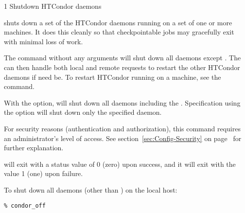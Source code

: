 \begin{ManPage}{\label{man-condor-off}}{1}
{Shutdown HTCondor daemons}
\Synopsis {}
\ToolArgsBase

\ToolDebugOption
\ToolWhere
\ToolArgsAffect


\Description 

 shuts down a set of the HTCondor daemons running on a set of
one or more machines.
It does this cleanly so that checkpointable jobs may gracefully exit with
minimal loss of work.

The command  without any arguments will shut down
all daemons except .
The  can then handle both local and remote
requests to restart the other HTCondor daemons if need be.  To restart
HTCondor running on a machine, see the  command.

With the  option,  will shut down
all daemons including the .
Specification using the  option
will shut down
only the specified daemon.

For security reasons (authentication and authorization),
this command requires an administrator's level of access.
See
section~\ref{sec:Config-Security} on page~\pageref{sec:Config-Security}
for further explanation.

\begin{Options}
	\ToolArgsBaseDesc
	\ToolDebugDesc
	\ToolArgsLocateDesc
	\ToolArgsAffectDesc
\end{Options}

\ExitStatus
{} will exit with a status value of 0 (zero) upon success,
and it will exit with the value 1 (one) upon failure.


\Examples
To shut down all daemons (other than ) on the
local host:
\begin{verbatim}
% condor_off
\end{verbatim}


\end{ManPage}
